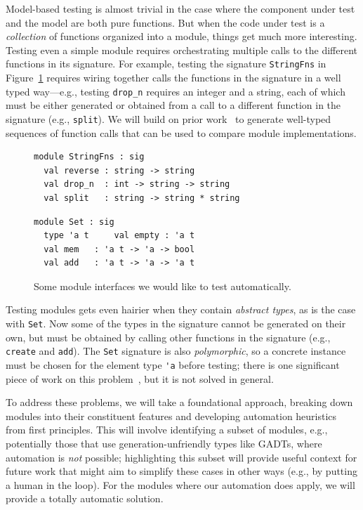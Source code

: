 Model-based testing is almost trivial in the case where
the component under test and the model are both pure functions.  But
when the code under test is a {\em
  collection} of functions
organized into a module, things get much more interesting. Testing even a simple
module requires orchestrating multiple calls to the different functions in
its signature. For example, testing the signature \lstinline{StringFns} in
Figure~\ref{fig:sigs} requires wiring together calls the functions in the
signature in a well typed way---e.g., testing \lstinline{drop_n}
requires an integer and a string, each of which must be either generated or
obtained from a call to a different function in the signature (e.g., \lstinline{split}).
We will build on prior
work~\cite{hughes_experiences_2016} to generate well-typed sequences of function
calls that can be used to compare module implementations.

\begin{figure}[t]
  \begin{minipage}{.45\textwidth}
\begin{lstlisting}
module StringFns : sig
  val reverse : string -> string
  val drop_n  : int -> string -> string
  val split   : string -> string * string
\end{lstlisting}
  \end{minipage}
  \qquad\qquad
  \begin{minipage}{.45\textwidth}
\begin{lstlisting}
module Set : sig
  type 'a t     val empty : 'a t
  val mem   : 'a t -> 'a -> bool
  val add   : 'a t -> 'a -> 'a t
\end{lstlisting}
  \end{minipage}
  \vspace{-2mm}
  \caption{Some module interfaces we would like to test
    automatically.}\label{fig:sigs}
\end{figure}

Testing modules gets even hairier when they contain {\em abstract types}, as is
the case with \lstinline{Set}. Now some of the types in the signature cannot be
generated on their own, but must be obtained by
calling other functions in the signature (e.g., \lstinline{create} and \lstinline{add}). The \lstinline{Set} signature is
also {\em polymorphic}, so a concrete instance must be chosen for
the element type \lstinline{'a} before
testing; there is one significant piece of work on this
problem~\cite{hou_favonia_logarithm_2022}, but it is not solved in general.

To address these problems, we will take a foundational approach, breaking down
modules into their constituent features and developing automation
heuristics from first
principles. This will involve identifying a subset of modules, e.g., potentially
those that use generation-unfriendly types like GADTs, where automation is {\em
not} possible; highlighting this subset will provide useful context for future
work that might aim to simplify these cases in other ways (e.g., by putting a
human in the loop). For the modules where our automation does apply, we will
provide a totally automatic solution.

